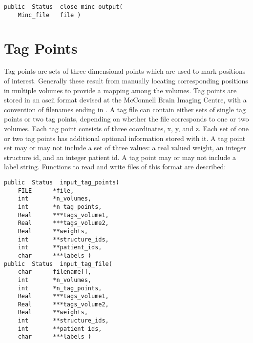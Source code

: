 {\bf\begin{verbatim}
public  Status  close_minc_output(
    Minc_file   file )
\end{verbatim}}


\chapter{Tag Points}

Tag points are sets of three dimensional points which are used to mark
positions of interest.  Generally these result from manually locating
corresponding positions in multiple volumes to provide a mapping among
the volumes.  Tag points are stored in an ascii format devised at the
McConnell Brain Imaging Centre, with a convention of filenames ending in
.  A tag file can contain either sets of single tag points
or two tag points, depending on whether the file corresponds to one or
two volumes.  Each tag point consists of three coordinates, x, y, and
z.  Each set of one or two tag points has additional optional
information stored with it.  A tag point set may or may not include a
set of three values:  a real valued weight, an integer structure id,
and an integer patient id.  A tag point may or may not include a label
string.  Functions to read and write files of this
format are described:

{\bf\begin{verbatim}
public  Status  input_tag_points(
    FILE      *file,
    int       *n_volumes,
    int       *n_tag_points,
    Real      ***tags_volume1,
    Real      ***tags_volume2,
    Real      **weights,
    int       **structure_ids,
    int       **patient_ids,
    char      ***labels )
public  Status  input_tag_file(
    char      filename[],
    int       *n_volumes,
    int       *n_tag_points,
    Real      ***tags_volume1,
    Real      ***tags_volume2,
    Real      **weights,
    int       **structure_ids,
    int       **patient_ids,
    char      ***labels )
\end{verbatim}}


